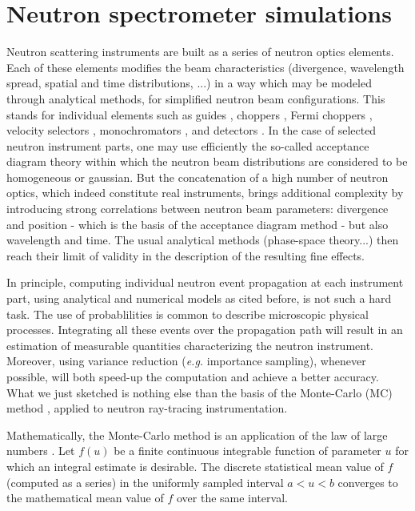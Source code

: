 \section{Neutron spectrometer simulations}

Neutron scattering instruments are built as a series of neutron optics elements. Each of these elements modifies the beam characteristics (divergence, wavelength spread, spatial and time distributions, ...) in a way which may be modeled through analytical methods, for simplified neutron beam configurations.
This stands for individual elements such as guides \cite{Leibnitz63,Mildner90}, choppers \cite{Lowde60,Copley03}, Fermi choppers \cite{Fermi47,Peters05}, velocity selectors \cite{Clark66}, monochromators \cite{Freund83,Sears97,Shirane02,Alianelli04}, and detectors \cite{Radeka74,Charpak89,Manzin04}.
In the case of selected neutron instrument parts, one may use efficiently the so-called acceptance diagram theory \cite{Mildner90,Copley93,Cussen03} within which the neutron beam distributions are considered to be homogeneous or gaussian.
But the concatenation of a high number of neutron optics, which indeed constitute real instruments, brings additional complexity by introducing strong correlations between neutron beam parameters: divergence and position - which is the basis of the acceptance diagram method - but also wavelength and time. The usual analytical methods (phase-space theory...) then reach their limit of validity in the description of the resulting fine effects.

In principle, computing individual neutron event propagation at each instrument part, using analytical and numerical models as cited before, is not such a hard task. The use of probablilities is common to describe microscopic physical processes. Integrating all these events over the propagation path will result in an estimation of measurable quantities characterizing the neutron instrument. Moreover, using variance reduction ({\it e.g.} importance sampling), whenever possible, will both speed-up the computation and achieve a better accuracy. What we just sketched is nothing else than the basis of the Monte-Carlo (MC) method \cite{James80}, applied to neutron ray-tracing instrumentation.

Mathematically, the Monte-Carlo method is an application of the law of large numbers \cite{James80,Grimmett92}. Let $f(u)$ be a finite continuous integrable function of parameter $u$ for which an integral estimate is desirable. The discrete statistical mean value of $f$ (computed as a series) in the uniformly sampled interval $a < u < b$ converges to the mathematical mean value of $f$ over the same interval.

